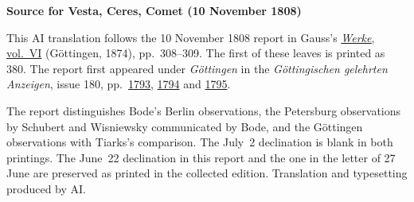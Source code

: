 \clearpage\thispagestyle{empty}
\begin{center}\textbf{Source for Vesta, Ceres, Comet (10 November 1808)}\end{center}
\noindent This AI translation follows the 10 November 1808 report in Gauss’s \href{https://gdz.sub.uni-goettingen.de/id/PPN236007467}{\textit{Werke}, vol.~VI} (Göttingen, 1874), pp.~308--309. The first of these leaves is printed as 380. The report first appeared under \textit{Göttingen} in the \textit{Göttingischen gelehrten Anzeigen}, issue 180, pp.~\href{https://manifests.sub.uni-goettingen.de/iiif/image/gdz:PPN319721507_1808:00001799/full/1600,/0/default.jpg}{1793}, \href{https://manifests.sub.uni-goettingen.de/iiif/image/gdz:PPN319721507_1808:00001800/full/1600,/0/default.jpg}{1794} and \href{https://manifests.sub.uni-goettingen.de/iiif/image/gdz:PPN319721507_1808:00001801/full/1600,/0/default.jpg}{1795}.
\par\medskip
The report distinguishes Bode’s Berlin observations, the Petersburg observations by Schubert and Wisniewsky communicated by Bode, and the Göttingen observations with Tiarks’s comparison. The July~2 declination is blank in both printings. The June~22 declination in this report and the one in the letter of 27 June are preserved as printed in the collected edition. Translation and typesetting produced by AI.
\clearpage
